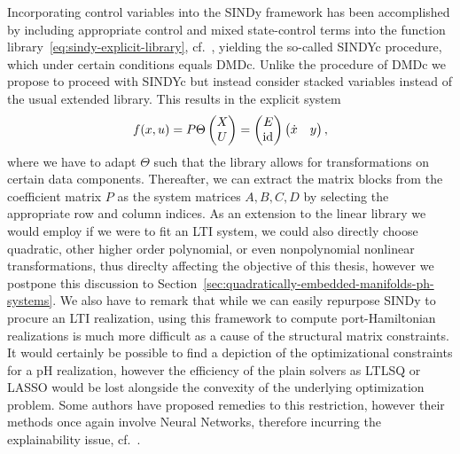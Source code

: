 Incorporating control variables into the SINDy framework has been accomplished by including appropriate control and mixed state-control terms into the function library~\eqref{eq:sindy-explicit-library}, cf.~\cite{Kaiser2018}, yielding the so-called SINDYc procedure, which under certain conditions equals DMDc.
Unlike the procedure of DMDc we propose to proceed with SINDYc but instead consider stacked variables instead of the usual extended library.
This results in the explicit system
\begin{equation}\label{eq:sindy-io}
    f(x, u) = P \Theta \begin{pmatrix}
        X \\
        U
    \end{pmatrix} = \begin{pmatrix}
        E \\
        \text{id}_{}
    \end{pmatrix} \begin{pmatrix}
        \dot{x} & y
    \end{pmatrix},
\end{equation}
where we have to adapt $\Theta$ such that the library allows for transformations on certain data components.
Thereafter, we can extract the matrix blocks from the coefficient matrix $P$ as the system matrices $A, B, C, D$ by selecting the appropriate row and column indices.
As an extension to the linear library we would employ if we were to fit an LTI system, we could also directly choose quadratic, other higher order polynomial, or even nonpolynomial nonlinear transformations, thus direclty affecting the objective of this thesis, however we postpone this discussion to Section~\ref{sec:quadratically-embedded-manifolds-ph-systems}.
We also have to remark that while we can easily repurpose SINDy to procure an LTI realization, using this framework to compute port-Hamiltonian realizations is much more difficult as a cause of the structural matrix constraints.
It would certainly be possible to find a depiction of the optimizational constraints for a pH realization, however the efficiency of the plain solvers as LTLSQ or LASSO would be lost alongside the convexity of the underlying optimization problem.
Some authors have proposed remedies to this restriction, however their methods once again involve Neural Networks, therefore incurring the explainability issue, cf.~\cite{Lee2022}.



